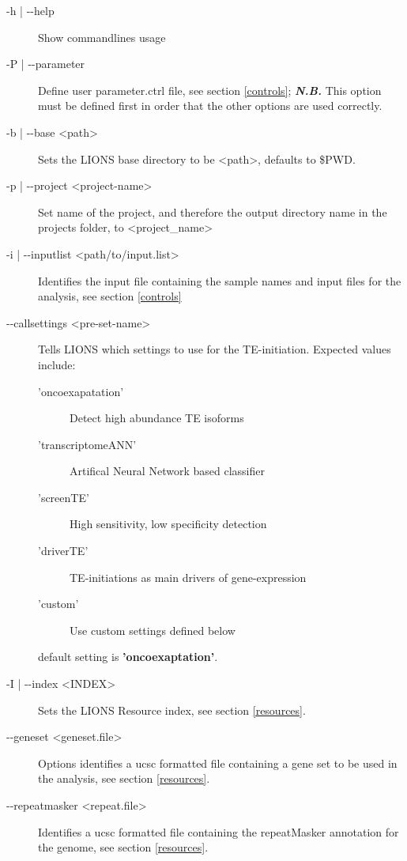 \documentclass[11pt]{scrartcl}
\newcommand{\arrows}[1]{\textless #1\textgreater}
\begin{document}
\begin{description}
\item[-h | -{}-help] Show commandlines usage
\item[-P | -{}-parameter] Define user parameter.ctrl file, see section \ref{controls}; \textit{\textbf{N.B.}} This option must be defined first in order that the other options are used correctly. 
\item[-b | -{}-base \arrows{path}] Sets the LIONS base directory to be <path>, defaults to \$PWD.
\item[-p | -{}-project \arrows{project-name}] Set name of the project, and therefore the output directory name in the projects folder, to <project\_name>
\item[-i | -{}-inputlist \arrows{path/to/input.list}] Identifies the input file containing the sample names and input files for the analysis, see section \ref{controls}
\item[-{}-callsettings \arrows{pre-set-name}] Tells LIONS which settings to use for the TE-initiation. Expected values include: 
        \begin{description}
        \item['oncoexapatation'] Detect high abundance TE isoforms
        \item['transcriptomeANN'] Artifical Neural Network based classifier
        \item['screenTE'] High sensitivity, low specificity detection
        \item['driverTE'] TE-initiations as main drivers of gene-expression
        \item['custom'] Use custom settings defined below
        \end{description}
	default setting is \textbf{'oncoexaptation'}.

\item[-I | -{}-index \arrows{INDEX}] Sets the LIONS Resource index, see section \ref{resources}.
\item[-{}-geneset \arrows{geneset.file}] Options identifies a ucsc formatted file containing a gene set to be
  used in the analysis, see section \ref{resources}.
\item[-{}-repeatmasker \arrows{repeat.file}] Identifies a ucsc formatted file containing the repeatMasker
  annotation for the genome, see section \ref{resources}.


\end{description}
\end{document}

